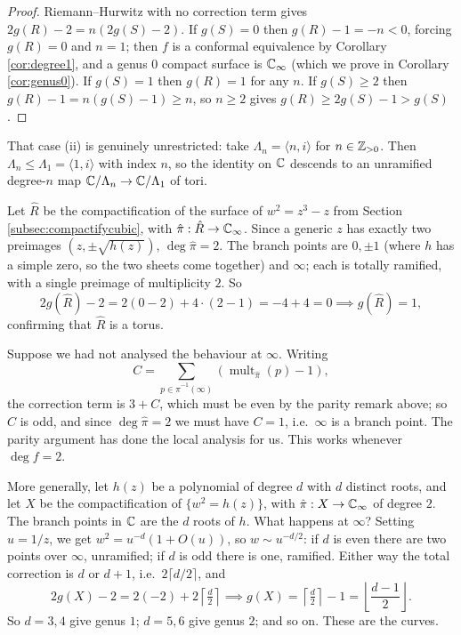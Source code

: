 \documentclass[a4paper]{scrartcl}
\newcommand{\genby}[1]{\langle #1 \rangle}
\newcommand{\Cinf}{\C_\infty}
\newcommand{\mult}{\operatorname{mult}}
\begin{document}
\begin{proof}
	Riemann--Hurwitz with no correction term gives $2g(R)-2 = n(2g(S)-2)$. If $g(S)=0$ then
	$g(R) - 1 = -n < 0$, forcing $g(R) = 0$ and $n = 1$; then $f$ is a conformal equivalence
	by Corollary \ref{cor:degree1}, and a genus $0$ compact surface is $\Cinf$ (which we
	prove in Corollary \ref{cor:genus0}). If $g(S)=1$ then $g(R)=1$ for any $n$. If
	$g(S)\geq 2$ then $g(R) - 1 = n(g(S)-1) \geq n$, so $n \geq 2$ gives
	$g(R) \geq 2g(S)-1 > g(S)$.
\end{proof}

\begin{example}
	That case (ii) is genuinely unrestricted: take $\Lambda_n = \genby{n, i}$ for
	$n \in \mathbb{Z}_{>0}$. Then $\Lambda_n \leq \Lambda_1 = \genby{1,i}$ with index $n$, so the
	identity on $\mathbb{C}$ descends to an unramified degree-$n$ map $\mathbb{C}/\Lambda_n \to \mathbb{C}/\Lambda_1$
	of tori.
\end{example}

\begin{example}\label{rs-ex:cubicgenus}
	Let $\hat R$ be the compactification of the surface of $w^2 = z^3-z$ from Section
	\ref{subsec:compactifycubic}, with $\hat\pi : \hat R \to \Cinf$. Since a generic $z$
	has exactly two preimages $(z,\pm\sqrt{h(z)})$, $\deg\hat\pi = 2$. The branch points are
	$0, \pm 1$ (where $h$ has a simple zero, so the two sheets come together) and $\infty$;
	each is totally ramified, with a single preimage of multiplicity $2$. So
	$$
	2g(\hat R) - 2 = 2(0 - 2) + 4\cdot(2-1) = -4 + 4 = 0 \implies g(\hat R) = 1,
	$$
	confirming that $\hat R$ is a torus.
\end{example}

\begin{remark}
	Suppose we had not analysed the behaviour at $\infty$. Writing
	$$
	C = \sum_{p \in \hat\pi^{-1}(\infty)}\left(\mult_{\hat\pi}(p)-1\right),
	$$
	the correction term is
	$3 + C$, which must be even by the parity remark above; so $C$ is odd, and since
	$\deg\hat\pi = 2$ we must have $C = 1$, i.e.\ $\infty$ is a branch point. The parity
	argument has done the local analysis for us. This works whenever $\deg f = 2$.
\end{remark}

\begin{example}
	More generally, let $h(z)$ be a polynomial of degree $d$ with $d$ distinct roots, and
	let $X$ be the compactification of $\{w^2 = h(z)\}$, with $\hat\pi : X \to \Cinf$ of
	degree $2$. The branch points in $\mathbb{C}$ are the $d$ roots of $h$. What happens at
	$\infty$? Setting $u = 1/z$, we get $w^2 = u^{-d}(1 + O(u))$, so $w \sim u^{-d/2}$: if
	$d$ is even there are two points over $\infty$, unramified; if $d$ is odd there is one,
	ramified. Either way the total correction is $d$ or $d+1$, i.e.\ $2\lceil d/2\rceil$,
	and
	$$
	2g(X) - 2 = 2(-2) + 2\left\lceil \tfrac d2\right\rceil \implies g(X) = \left\lceil \tfrac d2\right\rceil - 1 = \left\lfloor \frac{d-1}{2}\right\rfloor.
	$$
	So $d = 3, 4$ give genus $1$; $d = 5,6$ give genus $2$; and so on. These are the
	 curves.
\end{example}
\end{document}
